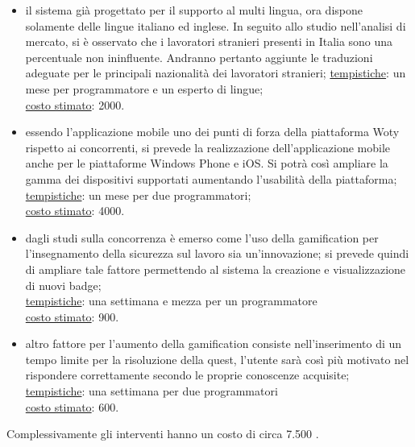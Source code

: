 \begin{itemize}
\item il sistema già progettato per il supporto al multi lingua, ora dispone solamente delle lingue italiano ed inglese. In seguito allo studio nell'analisi di mercato, si è osservato che i lavoratori stranieri presenti in Italia sono una percentuale non ininfluente. Andranno pertanto aggiunte le traduzioni adeguate per le principali nazionalità dei lavoratori stranieri;
\underline{tempistiche}: un mese per programmatore e un esperto di lingue;\\
\underline{costo stimato}: 2000\EUR.


\item essendo l'applicazione mobile uno dei punti di forza della piattaforma Woty rispetto ai concorrenti, si prevede la realizzazione dell'applicazione mobile anche per le piattaforme Windows Phone e iOS.
Si potrà così ampliare la gamma dei dispositivi supportati aumentando l'usabilità della piattaforma;\\
\underline{tempistiche}: un mese per due programmatori;\\
\underline{costo stimato}: 4000\EUR.


\item dagli studi sulla concorrenza è emerso come l'uso della gamification per l'insegnamento della sicurezza sul lavoro sia un'innovazione; si prevede quindi di ampliare tale fattore permettendo al sistema la creazione e visualizzazione di nuovi badge;\\
\underline{tempistiche}: una settimana e mezza per un programmatore\\
\underline{costo stimato}: 900\EUR.


\item altro fattore per l'aumento della gamification consiste nell'inserimento di un tempo limite per la risoluzione della quest, l'utente sarà così più motivato nel rispondere correttamente secondo le proprie conoscenze acquisite;\\
\underline{tempistiche}: una settimana per due programmatori\\
\underline{costo stimato}: 600\EUR.

\end{itemize}


Complessivamente gli interventi hanno un costo di circa 7.500 \EUR.






